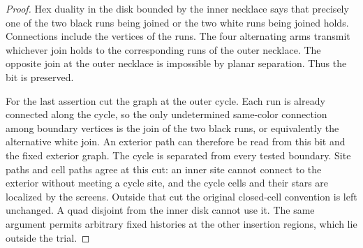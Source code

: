 \begin{proof}
Hex duality in the disk bounded by the inner necklace says that precisely
one of the two black runs being joined or the two white runs being joined
holds.  Connections include the vertices of the runs.  The four
alternating arms transmit whichever join holds to the corresponding runs
of the outer necklace.  The opposite join at the outer necklace is
impossible by planar separation.  Thus the bit is preserved.

For the last assertion cut the graph at the outer cycle.  Each run is
already connected along the cycle, so the only undetermined same-color
connection among boundary vertices is the join of the two black runs,
or equivalently the alternative white join.  An exterior path can
therefore be read from this bit and the fixed exterior graph.  The cycle
is separated from every tested boundary.  Site paths and cell paths agree
at this cut: an inner site cannot connect to the exterior without meeting
a cycle site, and the cycle cells and their stars are localized by the
screens.  Outside that cut the original closed-cell convention is left
unchanged.  A quad disjoint from the inner disk cannot use it.  The same
argument permits arbitrary fixed histories at the other insertion
regions, which lie outside the trial.
\end{proof}

